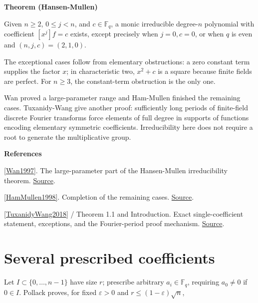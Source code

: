 \documentclass[11pt,a4paper,oneside,openany]{book}
\newenvironment{sources}{\par\smallskip\begingroup\footnotesize\color{atlasgray}\leftskip=10pt\setlength{\parskip}{2pt}}{\par\endgroup\smallskip}
\begin{document}
\begin{atlasblock}[standard]
\textbf{\sffamily Theorem (Hansen-Mullen)}\par\smallskip
\color{black} Given \(n\ge2\), \(0\le j<n\), and \(c\in\mathbb F_q\), a monic irreducible degree-\(n\) polynomial with coefficient \([x^j]f=c\) exists, except precisely when \(j=0,c=0\), or when \(q\) is even and \((n,j,c)=(2,1,0)\).\par
\end{atlasblock}\color{black}
\color{black} The exceptional cases follow from elementary obstructions: a zero constant term supplies the factor \(x\); in characteristic two, \(x^2+c\) is a square because finite fields are perfect. For \(n\ge3\), the constant-term obstruction is the only one.\par
\color{black} Wan proved a large-parameter range and Ham-Mullen finished the remaining cases. Tuxanidy-Wang give another proof: sufficiently long periods of finite-field discrete Fourier transforms force elements of full degree in supports of functions encoding elementary symmetric coefficients. Irreducibility here does not require a root to generate the multiplicative group.\par
\begin{sources}
\textbf{References}\par\smallskip
\noindent\hyperlink{ref:Wan1997}{[Wan1997]}. The large-parameter part of the Hansen-Mullen irreducibility theorem. \href{https://doi.org/10.1090/S0025-5718-97-00835-1}{Source}.\par
\noindent\hyperlink{ref:HamMullen1998}{[HamMullen1998]}. Completion of the remaining cases. \href{https://doi.org/10.1090/S0025-5718-98-00904-1}{Source}.\par
\noindent\hyperlink{ref:TuxanidyWang2018}{[TuxanidyWang2018]} / Theorem 1.1 and Introduction. Exact single-coefficient statement, exceptions, and the Fourier-period proof mechanism. \href{https://arxiv.org/abs/1604.04023}{Source}.\par
\end{sources}\color{black}
\section{Several prescribed coefficients}
\color{black} Let \(I\subset\{0,\ldots,n-1\}\) have size \(r\); prescribe arbitrary \(a_i\in\mathbb F_q\), requiring \(a_0\ne0\) if \(0\in I\). Pollack proves, for fixed \(\varepsilon>0\) and \(r\le(1-\varepsilon)\sqrt n\),\par
\end{document}
